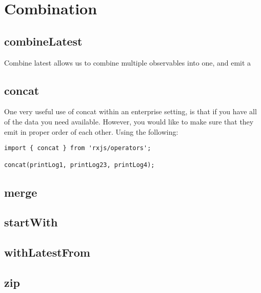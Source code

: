 \chapter{Combination}

\section{combineLatest}
Combine latest allows us to combine multiple observables into one, and emit a 

\section{concat}
One very useful use of concat within an enterprise setting, is that if you 
have all of the data you need available. However, you would like to make 
sure that they emit in proper order of each other. Using the following: 
\begin{lstlisting}[caption=concat-example.ts]
import { concat } from 'rxjs/operators';

concat(printLog1, printLog23, printLog4); 
\end{lstlisting}

\section{merge}


\section{startWith}

\section{withLatestFrom}

\section{zip}